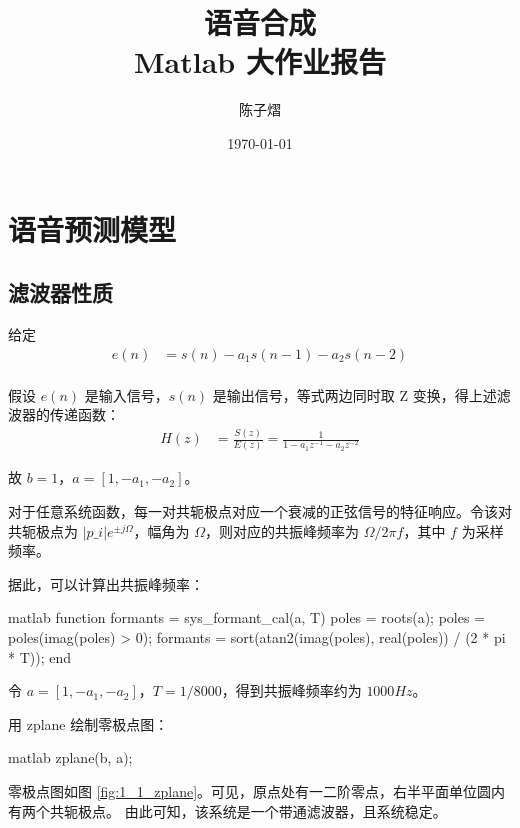 \documentclass[a4paper]{article}  %
\begin{document}
\title{\textbf{语音合成}\\Matlab 大作业报告}  %
\author{陈子熠}
\date{\today}
\maketitle

\tableofcontents

\newpage

\section{语音预测模型}

\subsection{滤波器性质}\label{sec:1_1}

给定
\begin{align*}
    e(n) &= s(n) - a_1s(n-1) - a_2s(n-2) \\
\end{align*}

假设 $e(n)$ 是输入信号，$s(n)$ 是输出信号，等式两边同时取 Z 变换，得上述滤波器的传递函数：
\begin{align*}
    H(z) &= \frac{S(z)}{E(z)} = \frac{1}{1 - a_1z^{-1} - a_2z^{-2}}
\end{align*}

故 $b = 1$，$a = [1, -a_1, -a_2]$。

对于任意系统函数，每一对共轭极点对应一个衰减的正弦信号的特征响应。令该对共轭极点为 $\lvert{p\_i}\rvert e^{\pm j\Omega}$，幅角为 $\Omega$，则对应的共振峰频率为 $\Omega / 2\pi f$，其中 $f$ 为采样频率。

据此，可以计算出共振峰频率：
\begin{codeblock}{matlab}
function formants = sys_formant_cal(a, T)
    poles = roots(a);
    poles = poles(imag(poles) > 0);
    formants = sort(atan2(imag(poles), real(poles)) / (2 * pi * T));
end
\end{codeblock}

令 $a = [1, -a_1, -a_2]$，$T = 1/8000$，得到共振峰频率约为 $1000 Hz$。

用 zplane 绘制零极点图：
\begin{codeblock}{matlab}
    zplane(b, a);
\end{codeblock}
零极点图如图 \ref{fig:1_1_zplane}。可见，原点处有一二阶零点，右半平面单位圆内有两个共轭极点。
由此可知，该系统是一个带通滤波器，且系统稳定。
\end{document}
